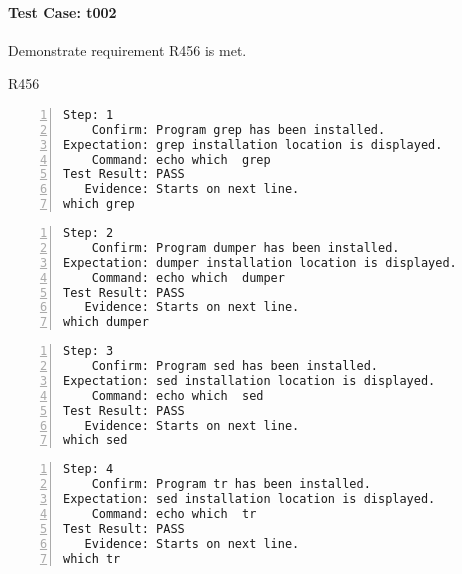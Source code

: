 \paragraph{Test Case: t002}
\begin{description}[align=right,leftmargin=*,labelindent=3cm]
\item[Purpose:] Demonstrate requirement R456 is met.
\item[Requirement:] R456
\end{description}
\begin{lstlisting}[numbers=left]
       Step: 1
    Confirm: Program grep has been installed.
Expectation: grep installation location is displayed.
    Command: echo which  grep 
Test Result: PASS
   Evidence: Starts on next line.
which grep

\end{lstlisting}
\begin{lstlisting}[numbers=left]
       Step: 2
    Confirm: Program dumper has been installed.
Expectation: dumper installation location is displayed.
    Command: echo which  dumper 
Test Result: PASS
   Evidence: Starts on next line.
which dumper

\end{lstlisting}
\begin{lstlisting}[numbers=left]
       Step: 3
    Confirm: Program sed has been installed.
Expectation: sed installation location is displayed.
    Command: echo which  sed 
Test Result: PASS
   Evidence: Starts on next line.
which sed

\end{lstlisting}
\begin{lstlisting}[numbers=left]
       Step: 4
    Confirm: Program tr has been installed.
Expectation: sed installation location is displayed.
    Command: echo which  tr 
Test Result: PASS
   Evidence: Starts on next line.
which tr

\end{lstlisting}
